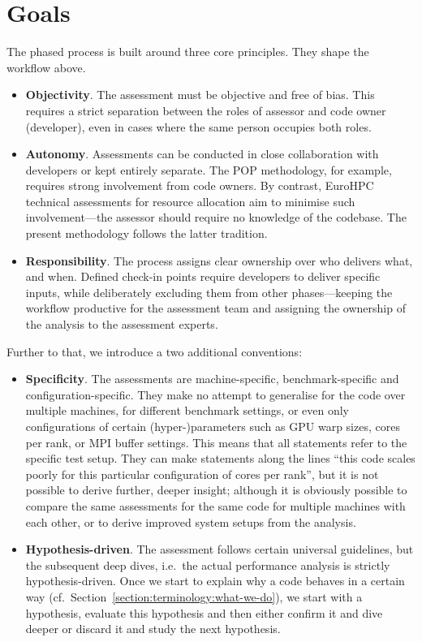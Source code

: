 \section{Goals}


The phased process is built around three core principles.
They shape the workflow above.


\begin{itemize}
  \item {\bf Objectivity}. 
    The assessment must be objective and free of bias. 
    This requires a strict separation between the roles of assessor and code owner (developer), even in cases where the same person occupies both roles.
  \item {\bf Autonomy}. 
    Assessments can be conducted in close collaboration with developers or kept entirely separate. 
    The POP methodology, for example, requires strong involvement from code owners.
    By contrast, EuroHPC technical assessments for resource allocation aim to minimise such involvement---the assessor should require no knowledge of the codebase. 
    The present methodology follows the latter tradition.
  \item {\bf Responsibility}. 
    The process assigns clear ownership over who delivers what, and when. 
    Defined check-in points require developers to deliver specific inputs, while deliberately excluding them from other phases---keeping the workflow productive for the assessment team and assigning the ownership of the analysis to the assessment experts.
\end{itemize}

\noindent
Further to that, we introduce a two additional conventions:

\begin{itemize}
  \item 
    {\bf Specificity}. The assessments are machine-specific, benchmark-specific and configuration-specific.
    They make no attempt to generalise for the code over multiple machines, for different benchmark settings, or even only configurations of certain (hyper-)parameters such as GPU warp sizes, cores per rank, or MPI buffer settings.
    This means that all statements refer to the specific test setup.
    They can make statements along the lines ``this code scales poorly for this particular configuration of cores per rank'', but it is not possible to derive further, deeper insight;
    although it is obviously possible to compare the same assessments for the same code for multiple machines with each other, or to derive improved system setups from the analysis.
  \item
    {\bf Hypothesis-driven}. The assessment follows certain universal guidelines, but the subsequent deep dives, i.e.~the actual performance analysis is strictly hypothesis-driven.
    Once we start to explain why a code behaves in a certain way (cf.~Section~\ref{section:terminology:what-we-do}), we start with a hypothesis, evaluate this hypothesis and then either confirm it and dive deeper or discard it and study the next hypothesis.
\end{itemize}


